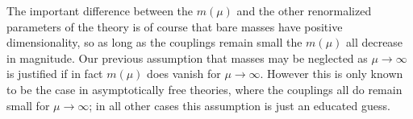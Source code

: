 The important difference between the $m(\mu)$ and the other renormalized parameters of the theory is of course that bare masses have positive dimensionality, so as long as the couplings remain small the $m(\mu)$ all decrease in magnitude. Our previous assumption that masses may be neglected as $\mu\to\infty$ is justified if in fact $m(\mu)$ does vanish for $\mu\to\infty$. However this is only known to be the case in asymptotically free theories, where the couplings all do remain small for $\mu\to\infty$; in all other cases this assumption is just an educated guess.
